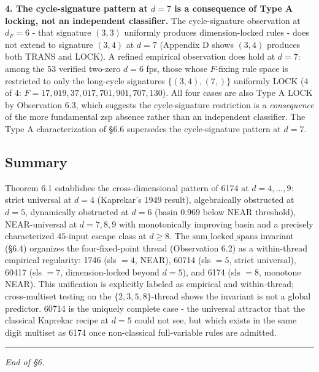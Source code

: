 \documentclass[11pt,letterpaper]{article}
\theoremstyle{paperstyle}
\theoremstyle{paperstyledef}
\theoremstyle{paperstylerem}
\begin{document}
\textbf{4. The cycle-signature pattern at \(d = 7\) is a consequence of
Type A locking, not an independent classifier.} The cycle-signature
observation at \(d_F = 6\) - that signature \((3, 3)\) uniformly
produces dimension-locked rules - does not extend to signature
\((3, 4)\) at \(d = 7\) (Appendix D shows \((3, 4)\) produces both TRANS
and LOCK). A refined empirical observation does hold at \(d = 7\): among
the 53 verified two-zero \(d = 6\) fps, those whose \(F\)-fixing rule
space is restricted to only the long-cycle signatures
\(\{(3, 4), (7,)\}\) uniformly LOCK (\(4\) of \(4\):
\(F = 17{,}019, 37{,}017, 701{,}901, 707{,}130\)). All four cases are
also Type A LOCK by Observation 6.3, which suggests the cycle-signature
restriction is a \emph{consequence} of the more fundamental zsp absence
rather than an independent classifier. The Type A characterization of
§6.6 supersedes the cycle-signature pattern at \(d = 7\).

\hypertarget{summary-2}{%
\subsection{Summary}\label{summary-2}}

Theorem 6.1 establishes the cross-dimensional pattern of 6174 at
\(d = 4, \ldots, 9\): strict universal at \(d = 4\) (Kaprekar's 1949
result), algebraically obstructed at \(d = 5\), dynamically obstructed
at \(d = 6\) (basin \(0.969\) below NEAR threshold), NEAR-universal at
\(d = 7, 8, 9\) with monotonically improving basin and a precisely
characterized \(45\)-input escape class at \(d \geq 8\). The
\(\mathrm{sum\_locked\_spans}\) invariant (§6.4) organizes the
four-fixed-point thread (Observation 6.2) as a within-thread empirical
regularity: 1746 (sls \(= 4\), NEAR), 60714 (sls \(= 5\), strict
universal), 60417 (sls \(= 7\), dimension-locked beyond \(d = 5\)), and
6174 (sls \(= 8\), monotone NEAR). This unification is explicitly
labeled as empirical and within-thread; cross-multiset testing on the
\(\{2, 3, 5, 8\}\)-thread shows the invariant is not a global predictor.
60714 is the uniquely complete case - the universal attractor that the
classical Kaprekar recipe at \(d = 5\) could not see, but which exists
in the same digit multiset as 6174 once non-classical full-variable
rules are admitted.

\begin{center}\rule{0.5\linewidth}{0.5pt}\end{center}

\emph{End of §6.}
\end{document}
